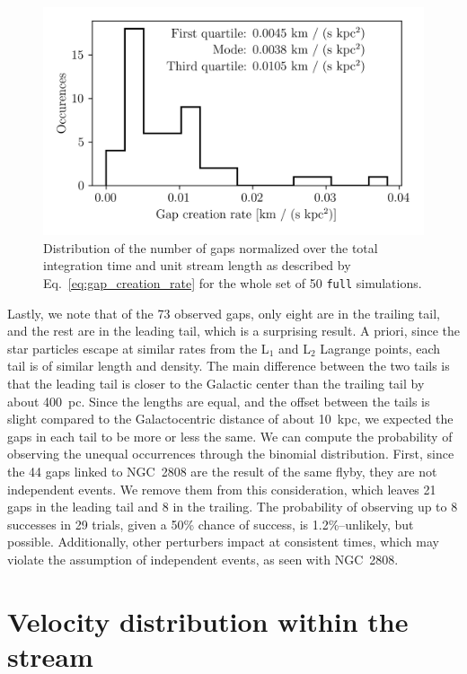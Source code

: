     \begin{figure}
        \centering
        \includegraphics[width=\linewidth]{images/gap_creation_rate.png}
        \caption{Distribution of the number of gaps normalized over the total integration time and unit stream length as described by Eq.~\ref{eq:gap_creation_rate} for the whole set of 50 \texttt{full} simulations. }
        \label{fig:gapcreationrate}
    \end{figure}

    Lastly, we note that of the 73 observed gaps, only eight are in the trailing tail, and the rest are in the leading tail, which is a surprising result. A priori, since the star particles escape at similar rates from the L$_1$ and L$_2$ Lagrange points, each tail is of similar length and density. The main difference between the two tails is that the leading tail is closer to the Galactic center than the trailing tail by about 400~pc. Since the lengths are equal, and the offset between the tails is slight compared to the Galactocentric distance of about 10~kpc, we expected the gaps in each tail to be more or less the same. We can compute the probability of observing the unequal occurrences through the binomial distribution. First, since the 44 gaps linked to NGC~2808 are the result of the same flyby, they are not independent events. We remove them from this consideration, which leaves 21 gaps in the leading tail and 8 in the trailing. The probability of observing up to 8 successes in 29 trials, given a 50\% chance of success, is 1.2\%--unlikely, but possible. Additionally, other perturbers impact at consistent times, which may violate the assumption of independent events, as seen with NGC~2808.



\section{Velocity distribution within the stream}

